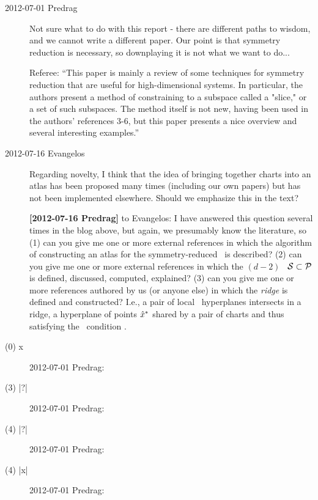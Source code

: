 \begin{description}

\item[2012-07-01 Predrag] Not sure what to do with this report -
there are different paths to wisdom, and we cannot
write a different paper. Our point is that symmetry reduction is
necessary, so downplaying it is not what we want to do...

\bigskip

Referee: ``This paper is mainly a review of some techniques for symmetry reduction
that are useful for high-dimensional systems. In particular, the authors
present a method of constraining to a subspace called a "slice," or a set
of such subspaces. The method itself is not new, having been used in the
authors' references 3-6, but this paper presents a nice overview and
several interesting examples.''

\item[2012-07-16 Evangelos]
	Regarding novelty, I think that the idea of bringing together
	charts into an atlas has been proposed many times (including our
	own papers) but has not been implemented elsewhere. Should we
	emphasize this in the text?

{\bf [2012-07-16 Predrag]} to Evangelos: I have answered this question
several times in the blog above, but again, we presumably know the
literature, so
(1) can you give me one or more external references in which the
algorithm of constructing an atlas for the symmetry-reduced \statesp\ is
described?
(2) can you give me one or more external references in which the
$(d\!-\!2)$\dmn\ \emph{\poincBord} ${\cal S} \subset {\cal P}$ is defined,
discussed, computed, explained?
(3) can you give me one or more references authored by us (or anyone
else) in which the \emph{ridge} is defined and constructed? I.e., a pair
of  local \slice\ hyperplanes intersects in a
{ridge}, a  hyperplane {\PoincS} of points
$\hat{x}^*$ shared by a pair of charts and thus satisfying the \slice\
condition .

\item[(0)  x ] 2012-07-01 Predrag:

\item[(3) |?|] 2012-07-01 Predrag:

\item[(4) |?|] 2012-07-01 Predrag:

\item[(4) |x|] 2012-07-01 Predrag:


\end{description}
